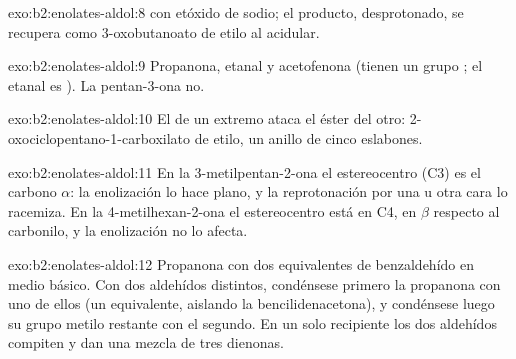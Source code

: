\begin{solution}{exo:b2:enolates-aldol:8}
 con etóxido de sodio; el producto, desprotonado, se
recupera como 3-oxobutanoato de etilo al acidular.
\end{solution}

\begin{solution}{exo:b2:enolates-aldol:9}
Propanona, etanal y acetofenona (tienen un grupo ; el etanal es ).
La pentan-3-ona no.
\end{solution}

\begin{solution}{exo:b2:enolates-aldol:10}
El  de un extremo ataca el éster del otro: 2-oxociclopentano-1-carboxilato de etilo, un
anillo de cinco eslabones.
\end{solution}

\begin{solution}{exo:b2:enolates-aldol:11}
En la 3-metilpentan-2-ona el estereocentro (C3) es el carbono $\alpha$: la enolización lo hace plano, y
la reprotonación por una u otra cara lo racemiza. En la 4-metilhexan-2-ona el estereocentro está en C4,
en $\beta$ respecto al carbonilo, y la enolización no lo afecta.
\end{solution}

\begin{solution}{exo:b2:enolates-aldol:12}
Propanona con dos equivalentes de benzaldehído en medio básico. Con dos aldehídos distintos, condénsese primero la
propanona con uno de ellos (un equivalente, aislando la bencilidenacetona), y condénsese luego su
grupo metilo restante con el segundo. En un solo recipiente los dos aldehídos compiten y dan una mezcla de
tres dienonas.
\end{solution}


